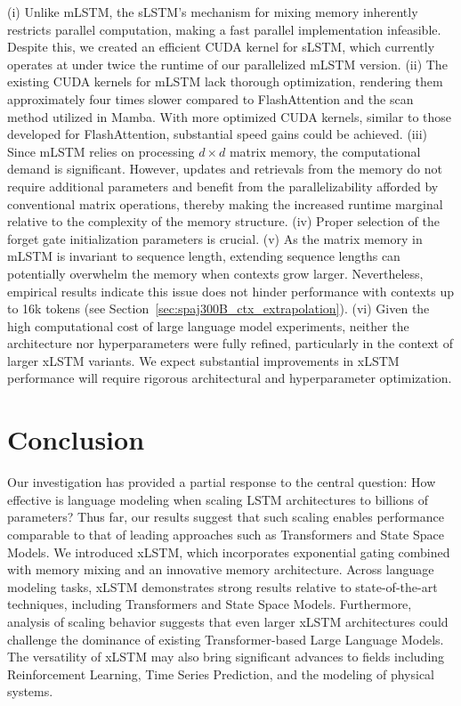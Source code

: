 (i) Unlike mLSTM, the sLSTM’s mechanism for mixing memory inherently restricts parallel computation, making a fast parallel implementation infeasible. Despite this, we created an efficient CUDA kernel for sLSTM, which currently operates at under twice the runtime of our parallelized mLSTM version. (ii) The existing CUDA kernels for mLSTM lack thorough optimization, rendering them approximately four times slower compared to FlashAttention and the scan method utilized in Mamba. With more optimized CUDA kernels, similar to those developed for FlashAttention, substantial speed gains could be achieved. (iii) Since mLSTM relies on processing $d \times d$ matrix memory, the computational demand is significant. However, updates and retrievals from the memory do not require additional parameters and benefit from the parallelizability afforded by conventional matrix operations, thereby making the increased runtime marginal relative to the complexity of the memory structure. (iv) Proper selection of the forget gate initialization parameters is crucial. (v) As the matrix memory in mLSTM is invariant to sequence length, extending sequence lengths can potentially overwhelm the memory when contexts grow larger. Nevertheless, empirical results indicate this issue does not hinder performance with contexts up to 16k tokens (see Section~\ref{sec:spaj300B_ctx_extrapolation}). (vi) Given the high computational cost of large language model experiments, neither the architecture nor hyperparameters were fully refined, particularly in the context of larger xLSTM variants. We expect substantial improvements in xLSTM performance will require rigorous architectural and hyperparameter optimization.

\section{Conclusion}
Our investigation has provided a partial response to the central question: How effective is language modeling when scaling LSTM architectures to billions of parameters? Thus far, our results suggest that such scaling enables performance comparable to that of leading approaches such as Transformers and State Space Models. We introduced xLSTM, which incorporates exponential gating combined with memory mixing and an innovative memory architecture. Across language modeling tasks, xLSTM demonstrates strong results relative to state-of-the-art techniques, including Transformers and State Space Models. Furthermore, analysis of scaling behavior suggests that even larger xLSTM architectures could challenge the dominance of existing Transformer-based Large Language Models. The versatility of xLSTM may also bring significant advances to fields including Reinforcement Learning, Time Series Prediction, and the modeling of physical systems.

